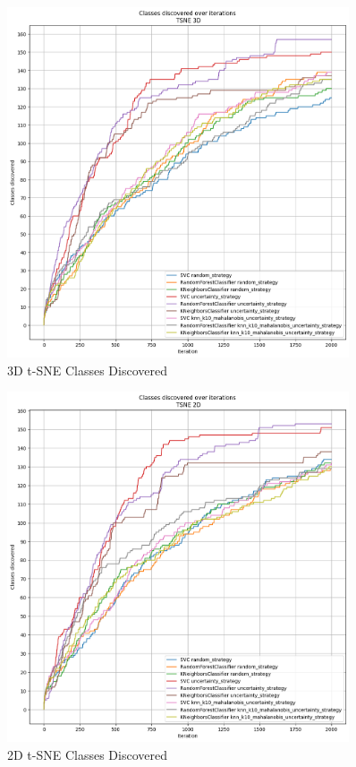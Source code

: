 \begin{figure}[htbp]
\centering
\includegraphics[width=0.9\textwidth]{resources/images/rev2_classes_discovered_tsne3d.png}
\caption{3D t-SNE Classes Discovered}
\end{figure}

\begin{figure}[htbp]
\centering
\includegraphics[width=0.9\textwidth]{resources/images/rev2_classes_discovered_tsne2d.png}
\caption{2D t-SNE Classes Discovered}
\end{figure}

